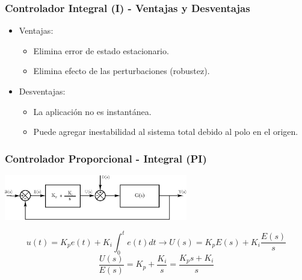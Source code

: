 \documentclass[aspectratio=169,handout]{beamer}
\theoremstyle{definition}
\theoremstyle{plain}
\theoremstyle{remark}
\begin{document}
\begin{frame}[<+->]\frametitle{Controlador Integral (I) - Ventajas y Desventajas}
  \begin{itemize}
    \item Ventajas:
    \begin{itemize}
      \item Elimina error de estado estacionario.
      \item Elimina efecto de las perturbaciones (robustez).
    \end{itemize}
    \item Desventajas:
    \begin{itemize}
      \item La aplicación no es instantánea.
      \item Puede agregar inestabilidad al sistema total debido al polo en el origen.
    \end{itemize}
  \end{itemize}
\end{frame}

\begin{frame}[<+->]\frametitle{Controlador Proporcional - Integral (PI)}
\begin{center}
  \includegraphics[width=8cm]{images/PIcontroller.eps}
\end{center}
\pause
\begin{equation*}
  u(t) = K_p e(t) + K_i \int_0^t e(t) dt \longrightarrow U(s) = K_p E(s) + K_i \frac{E(s)}{s}
\end{equation*}
\pause
\begin{equation*}
  \frac{U(s)}{E(s)} = K_p + \frac{K_i}{s} = \frac{K_p s + K_i}{s}
\end{equation*}
\end{frame}
\end{document}
